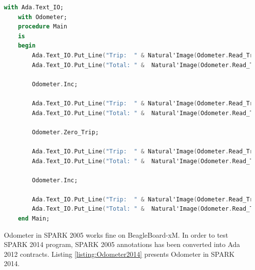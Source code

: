 \singlespacing
\begin{lstlisting}[language=ada, frame=single, gobble=0, caption={Main procedure for \lstinline{Odometer} package}, label={listing:main}]
	with Ada.Text_IO;
	with Odometer;
	procedure Main
	is
	begin
	    Ada.Text_IO.Put_Line("Trip:  " & Natural'Image(Odometer.Read_Trip));
	    Ada.Text_IO.Put_Line("Total: " &  Natural'Image(Odometer.Read_Total));

	    Odometer.Inc;

	    Ada.Text_IO.Put_Line("Trip:  " & Natural'Image(Odometer.Read_Trip));
	    Ada.Text_IO.Put_Line("Total: " &  Natural'Image(Odometer.Read_Total));

	    Odometer.Zero_Trip;

	    Ada.Text_IO.Put_Line("Trip:  " & Natural'Image(Odometer.Read_Trip));
	    Ada.Text_IO.Put_Line("Total: " &  Natural'Image(Odometer.Read_Total));

	    Odometer.Inc;

	    Ada.Text_IO.Put_Line("Trip:  " & Natural'Image(Odometer.Read_Trip));
	    Ada.Text_IO.Put_Line("Total: " &  Natural'Image(Odometer.Read_Total));
	end Main;
\end{lstlisting} 
\doublespacing

Odometer in SPARK 2005 works fine on BeagleBoard-xM. In order to test SPARK 2014 program, SPARK 2005 annotations has been converted into Ada 2012 contracts. Listing \ref{listing:Odometer2014} presents Odometer in SPARK 2014.

